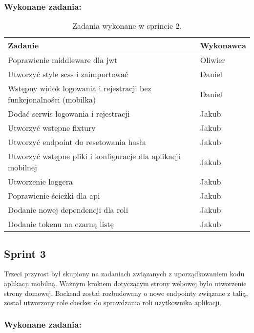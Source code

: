 \subsubsection{Wykonane zadania:}

\begin{table}[H]
\centering
\begin{tabularx}{\textwidth}{|p{}|X|}
    \hline
    \textbf{Zadanie} & \textbf{Wykonawca} \\
    \hline
    [BACKEND] Poprawienie middleware dla jwt & Oliwier \\
    \hline
    [MOBILE] Utworzyć style scss i zaimportować & Daniel \\
    \hline
    [MOBILE] Wstępny widok logowania i rejestracji bez funkcjonalności (mobilka) & Daniel \\
    \hline
    [MOBILE] Dodać serwis logowania i rejestracji & Jakub \\
    \hline
    [BACKEND] Utworzyć wstępne fixtury & Jakub \\
    \hline
    [BACKEND] Utworzyć endpoint do resetowania hasła & Jakub \\
    \hline
    [MOBILE] Utworzyć wstępne pliki i konfiguracje dla aplikacji mobilnej & Jakub \\
    \hline
    [BACKEND] Utworzenie loggera & Jakub \\
    \hline
    [BACKEND] Poprawienie ścieżki dla api & Jakub \\
    \hline
    [BACKEND] Dodanie nowej dependencji dla roli & Jakub \\
    \hline
    [BACKEND] Dodanie tokenu na czarną listę & Jakub \\
    \hline
\end{tabularx}
    \caption{Zadania wykonane w sprincie 2.}
\end{table}

\subsection{Sprint 3}

Trzeci przyrost był skupiony na zadaniach związanych z uporządkowaniem kodu aplikacji mobilną. Ważnym krokiem dotyczącym strony webowej było utworzenie strony domowej. Backend został rozbudowany o nowe endpointy związane z talią, został utworzony role checker do sprawdzania roli użytkownika aplikacji.

\subsubsection{Wykonane zadania:}

